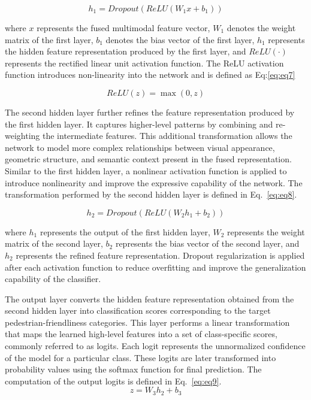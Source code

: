 \documentclass[11pt]{article}
\begin{document}
\begin{equation}
h_1 = Dropout(ReLU(W_1 x + b_1))
\label{eq:eq6}
\end{equation}

\noindent where \(x\) represents the fused multimodal feature vector, \(W_1\) denotes the weight matrix of the first layer, \(b_1\) denotes the bias vector of the first layer, \(h_1\) represents the hidden feature representation produced by the first layer, and \(ReLU(\cdot)\) represents the rectified linear unit activation function. The ReLU activation function introduces non-linearity into the network and is defined as Eq:\ref{eq:eq7}

\begin{equation}
ReLU(z) = \max(0,z)
\label{eq:eq7}
\end{equation}

\noindent The second hidden layer further refines the feature representation produced by the first hidden layer. It captures higher-level patterns by combining and re-weighting the intermediate features. This additional transformation allows the network to model more complex relationships between visual appearance, geometric structure, and semantic context present in the fused representation. Similar to the first hidden layer, a nonlinear activation function is applied to introduce nonlinearity and improve the expressive capability of the network. The transformation performed by the second hidden layer is defined in Eq.~\ref{eq:eq8}.

\begin{equation}
h_2 = Dropout(ReLU(W_2 h_1 + b_2))
\label{eq:eq8}
\end{equation}

\noindent where \(h_1\) represents the output of the first hidden layer, \(W_2\) represents the weight matrix of the second layer, \(b_2\) represents the bias vector of the second layer, and \(h_2\) represents the refined feature representation. Dropout regularization is applied after each activation function to reduce overfitting and improve the generalization capability of the classifier.

\noindent The output layer converts the hidden feature representation obtained from the second hidden layer into classification scores corresponding to the target pedestrian-friendliness categories. This layer performs a linear transformation that maps the learned high-level features into a set of class-specific scores, commonly referred to as logits. Each logit represents the unnormalized confidence of the model for a particular class. These logits are later transformed into probability values using the softmax function for final prediction. The computation of the output logits is defined in Eq.~\ref{eq:eq9}.
\begin{equation}
z = W_3 h_2 + b_3
\label{eq:eq9}
\end{equation}
\end{document}
